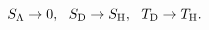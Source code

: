 \begin{equation}
\label{2eq10}
S_{\rm \Lambda} \to 0, ~~
S_{\rm D} \to S_{\rm H}
,~~T_{\rm D} \to T_{\rm H}.
\end{equation}

